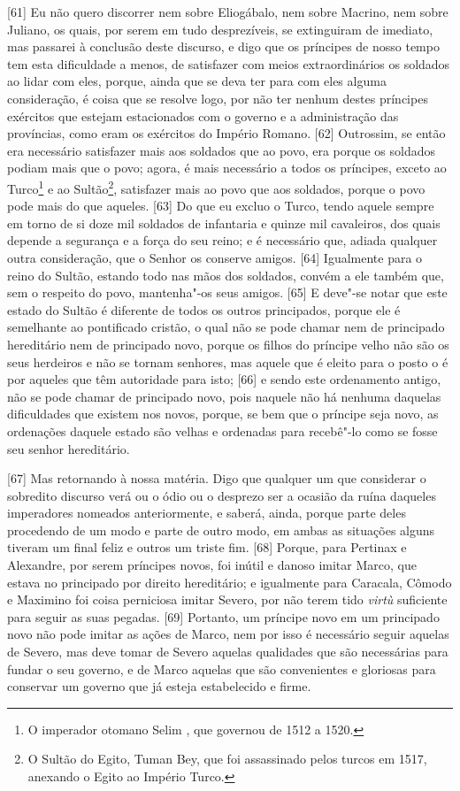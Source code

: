 {[}61{]} Eu não quero discorrer nem sobre Eliogábalo, nem sobre Macrino,
nem sobre Juliano, os quais, por serem em tudo desprezíveis, se
extinguiram de imediato, mas passarei à conclusão deste discurso, e digo
que os príncipes de nosso tempo tem esta dificuldade a menos, de
satisfazer com meios extraordinários os soldados ao lidar com eles,
porque, ainda que se deva ter para com eles alguma consideração, é coisa
que se resolve logo, por não ter nenhum destes príncipes exércitos que
estejam estacionados com o governo e a administração das províncias,
como eram os exércitos do Império Romano. {[}62{]} Outrossim, se então
era necessário satisfazer mais aos soldados que ao povo, era porque os
soldados podiam mais que o povo; agora, é mais necessário a todos os
príncipes, exceto ao Turco\footnote{O imperador otomano Selim , que
  governou de 1512 a 1520.} e ao Sultão\footnote{O Sultão do Egito,
  Tuman Bey, que foi assassinado pelos turcos em 1517, anexando o Egito
  ao Império Turco.}, satisfazer mais ao povo que aos soldados, porque o
povo pode mais do que aqueles. {[}63{]} Do que eu excluo o Turco, tendo
aquele sempre em torno de si doze mil soldados de infantaria e quinze
mil cavaleiros, dos quais depende a segurança e a força do seu reino; e
é necessário que, adiada qualquer outra consideração, que o Senhor os
conserve amigos. {[}64{]} Igualmente para o reino do Sultão, estando
todo nas mãos dos soldados, convém a ele também que, sem o respeito do
povo, mantenha"-os seus amigos. {[}65{]} E deve"-se notar que este estado
do Sultão é diferente de todos os outros principados, porque ele é
semelhante ao pontificado cristão, o qual não se pode chamar nem de
principado hereditário nem de principado novo, porque os filhos do
príncipe velho não são os seus herdeiros e não se tornam senhores, mas
aquele que é eleito para o posto o é por aqueles que têm autoridade para
isto; {[}66{]} e sendo este ordenamento antigo, não se pode chamar de
principado novo, pois naquele não há nenhuma daquelas dificuldades que
existem nos novos, porque, se bem que o príncipe seja novo, as
ordenações daquele estado são velhas e ordenadas para recebê"-lo como se
fosse seu senhor hereditário.

{[}67{]} Mas retornando à nossa matéria. Digo que qualquer um que
considerar o sobredito discurso verá ou o ódio ou o desprezo ser a
ocasião da ruína daqueles imperadores nomeados anteriormente, e saberá,
ainda, porque parte deles procedendo de um modo e parte de outro modo,
em ambas as situações alguns tiveram um final feliz e outros um triste
fim. {[}68{]} Porque, para Pertinax e Alexandre, por serem príncipes
novos, foi inútil e danoso imitar Marco, que estava no principado por
direito hereditário; e igualmente para Caracala, Cômodo e Maximino foi
coisa perniciosa imitar Severo, por não terem tido \emph{virtù}
suficiente para seguir as suas pegadas. {[}69{]} Portanto, um príncipe
novo em um principado novo não pode imitar as ações de Marco, nem por
isso é necessário seguir aquelas de Severo, mas deve tomar de Severo
aquelas qualidades que são necessárias para fundar o seu governo, e de
Marco aquelas que são convenientes e gloriosas para conservar um governo
que já esteja estabelecido e firme.

